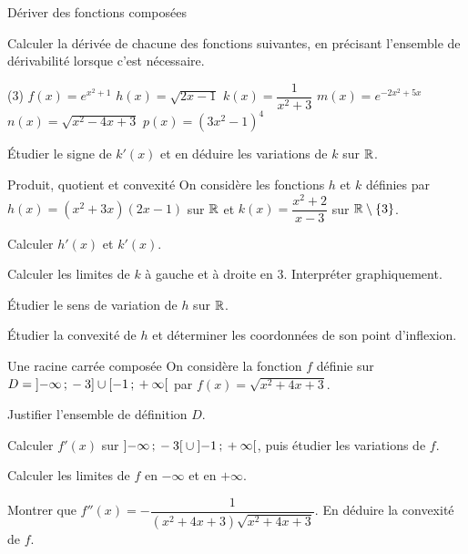 \begin{exercice}[2]{Dériver des fonctions composées}
\begin{questions}
  \item Calculer la dérivée de chacune des fonctions suivantes, en précisant l'ensemble de dérivabilité
    lorsque c'est nécessaire.
    \begin{tasks}(3)
      \task $f(x)=e^{x^{2}+1}$
      \task $h(x)=\sqrt{2x-1}$
      \task $k(x)=\dfrac{1}{x^{2}+3}$
      \task $m(x)=e^{-2x^{2}+5x}$
      \task $n(x)=\sqrt{x^{2}-4x+3}$
      \task $p(x)=\left(3x^{2}-1\right)^{4}$
    \end{tasks}
  \item Étudier le signe de $k'(x)$ et en déduire les variations de $k$ sur $\mathbb{R}$.
\end{questions}
\end{exercice}

\begin{exercice}[2]{Produit, quotient et convexité}
On considère les fonctions $h$ et $k$ définies par $h(x)=\left(x^{2}+3x\right)(2x-1)$ sur $\mathbb{R}$ et
$k(x)=\dfrac{x^{2}+2}{x-3}$ sur $\mathbb{R}\setminus\{3\}$.
\begin{questions}
  \item Calculer $h'(x)$ et $k'(x)$.
  \item Calculer les limites de $k$ à gauche et à droite en $3$. Interpréter graphiquement.
  \item Étudier le sens de variation de $h$ sur $\mathbb{R}$.
  \item Étudier la convexité de $h$ et déterminer les coordonnées de son point d'inflexion.
\end{questions}
\end{exercice}

\begin{exercice}[2]{Une racine carrée composée}
On considère la fonction $f$ définie sur $D=\mathopen{]}-\infty\,{;}\,-3\mathclose{]}\cup\mathopen{[}-1\,{;}\,+\infty\mathclose{[}$ par $f(x)=\sqrt{x^{2}+4x+3}$.
\begin{questions}
  \item Justifier l'ensemble de définition $D$.
  \item Calculer $f'(x)$ sur $\mathopen{]}-\infty\,{;}\,-3\mathclose{[}\cup\mathopen{]}-1\,{;}\,+\infty\mathclose{[}$, puis étudier les variations de $f$.
  \item Calculer les limites de $f$ en $-\infty$ et en $+\infty$.
  \item Montrer que $f''(x)=-\dfrac{1}{\left(x^{2}+4x+3\right)\sqrt{x^{2}+4x+3}}$. En déduire la convexité de $f$.
\end{questions}
\end{exercice}

